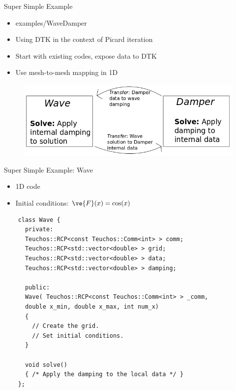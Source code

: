 \documentclass{beamer}
\begin{document}
\begin{frame}{Super Simple Example}

  \begin{itemize}
  \item examples/WaveDamper
    \medskip
  \item Using DTK in the context of Picard iteration
    \medskip
  \item Start with existing codes, expose data to DTK
  \item Use mesh-to-mesh mapping in 1D
  \end{itemize}

  \begin{figure}
    \centering
    \includegraphics[width=4.5in]{wavedamperexample.png}
  \end{figure}

\end{frame}

\begin{frame}[fragile]{Super Simple Example: Wave}

  \begin{itemize}
  \item 1D code
  \item Initial conditions: $\ve{F}(x) = \cos(x)$
  \end{itemize}

  \begin{lstlisting}
    class Wave {
      private:
      Teuchos::RCP<const Teuchos::Comm<int> > comm;
      Teuchos::RCP<std::vector<double> > grid;
      Teuchos::RCP<std::vector<double> > data;
      Teuchos::RCP<std::vector<double> > damping;

      public:
      Wave( Teuchos::RCP<const Teuchos::Comm<int> > _comm,
      double x_min, double x_max, int num_x)
      {
        // Create the grid.
        // Set initial conditions.
      }

      void solve()
      { /* Apply the damping to the local data */ }
    };
  \end{lstlisting}

\end{frame}
\end{document}
